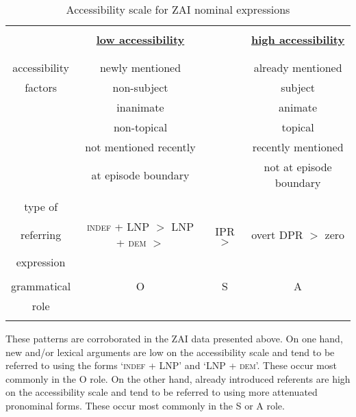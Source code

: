 \begin{table}
 
\begin{tabular}{ c  c  c  c }
\lsptoprule
  
      & &  &   \\
       &   \textbf{\underline{low accessibility}}  &  &  \textbf{\underline{high accessibility}}  \\
 
  & &  & \\
 
\midrule
 & & & \\

accessibility &  newly mentioned  &   & already mentioned   \\
factors &  non-subject  &   & subject   \\
   &    inanimate  &  & animate  \\
   &     non-topical  &   & topical  \\
    &      not mentioned recently  &  & recently mentioned   \\
      &      at episode boundary  &   & not at episode boundary \\
      
       & &  &   \\
  
\midrule

type of  &  & &   \\  
referring & \textsc{indef}  + LNP $>$ LNP + \textsc{dem}  $>$ &    IPR  $>$ &  overt DPR $>$ zero \\
expression & &    &  \\

 
\midrule
 & &  & \\
  grammatical & O &  S & A \\
role & & &  \\
& & & \\

\midrule

\end{tabular}\caption{{Accessibility scale for ZAI nominal expressions}}
\label{accessibilityscale}

\end{table}
 
These patterns are corroborated in the ZAI data presented above. On one hand, new and/or lexical arguments are low on the accessibility scale and tend to be referred to using the forms `\textsc{indef}  + LNP' and `LNP + \textsc{dem}'. These occur most commonly in the O role. On the other hand, already introduced referents are high on the accessibility scale and tend to be referred to using more attenuated pronominal forms. These occur most commonly in the S or A role. 

